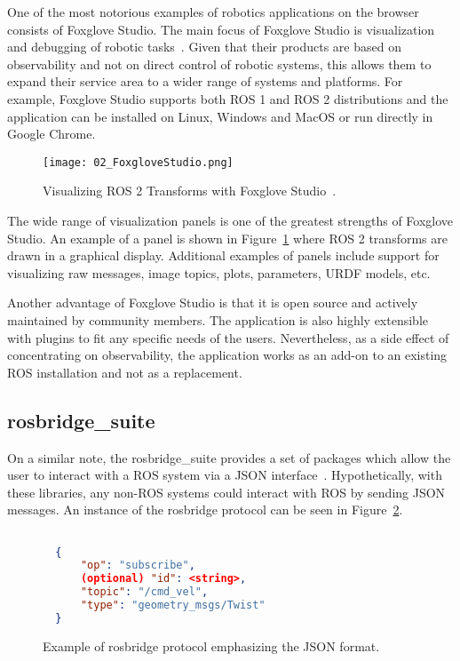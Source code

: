         One of the most notorious examples of robotics applications on the browser consists of Foxglove Studio. The main focus of Foxglove Studio is visualization and debugging of robotic tasks~\cite{foxglove}. Given that their products are based on observability and not on direct control of robotic systems, this allows them to expand their service area to a wider range of systems and platforms. For example, Foxglove Studio supports both \ac{ROS} 1 and \ac{ROS} 2 distributions and the application can be installed on Linux, Windows and MacOS or run directly in Google Chrome.
        
        \begin{figure}[htbp]
            \centering
            \texttt{[image: 02\_FoxgloveStudio.png]}
            \caption{Visualizing ROS 2 Transforms with Foxglove Studio~\cite{transforms}.}
            \label{fig:foxglove}
        \end{figure}

        The wide range of visualization panels is one of the greatest strengths of Foxglove Studio. An example of a panel is shown in Figure~\ref{fig:foxglove} where \ac{ROS} 2 transforms are drawn in a graphical display. Additional examples of panels include support for visualizing raw messages, image topics, plots, parameters, \ac{URDF} models, etc.

        Another advantage of Foxglove Studio is that it is open source and actively maintained by community members. The application is also highly extensible with plugins to fit any specific needs of the users. Nevertheless, as a side effect of concentrating on observability, the application works as an add-on to an existing ROS installation and not as a replacement.

    \subsection{\textsf{rosbridge\_suite}}

        On a similar note, the \textsf{rosbridge\_suite} provides a set of packages which allow the user to interact with a \ac{ROS} system via a \ac{JSON} interface~\cite{rosbridge}. Hypothetically, with these libraries, any non-ROS systems could interact with ROS by sending \ac{JSON} messages. An instance of the \textsf{rosbridge} protocol can be seen in Figure~\ref{fig:rosbridge}.

        \begin{figure}[htbp]
            \centering
            \begin{lstlisting}[language=JSON]

  {
      "op": "subscribe",
      (optional) "id": <string>,
      "topic": "/cmd_vel",
      "type": "geometry_msgs/Twist"
  }
            \end{lstlisting}
            \caption{Example of \textsf{rosbridge} protocol emphasizing the JSON format.}
            \label{fig:rosbridge}
        \end{figure}

